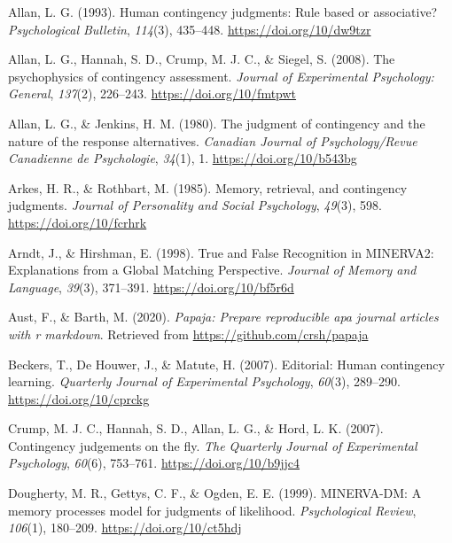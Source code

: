 \documentclass[
  english,
  man,floatsintext]{apa6}
\begin{document}
\leavevmode\hypertarget{ref-allanHumanContingencyJudgments1993}{}%
Allan, L. G. (1993). Human contingency judgments: Rule based or associative? \emph{Psychological Bulletin}, \emph{114}(3), 435--448. \url{https://doi.org/10/dw9tzr}

\leavevmode\hypertarget{ref-allanPsychophysicsContingencyAssessment2008}{}%
Allan, L. G., Hannah, S. D., Crump, M. J. C., \& Siegel, S. (2008). The psychophysics of contingency assessment. \emph{Journal of Experimental Psychology: General}, \emph{137}(2), 226--243. \url{https://doi.org/10/fmtpwt}

\leavevmode\hypertarget{ref-allanJudgmentContingencyNature1980}{}%
Allan, L. G., \& Jenkins, H. M. (1980). The judgment of contingency and the nature of the response alternatives. \emph{Canadian Journal of Psychology/Revue Canadienne de Psychologie}, \emph{34}(1), 1. \url{https://doi.org/10/b543bg}

\leavevmode\hypertarget{ref-arkesMemoryRetrievalContingency1985}{}%
Arkes, H. R., \& Rothbart, M. (1985). Memory, retrieval, and contingency judgments. \emph{Journal of Personality and Social Psychology}, \emph{49}(3), 598. \url{https://doi.org/10/fcrhrk}

\leavevmode\hypertarget{ref-arndtTrueFalseRecognition1998}{}%
Arndt, J., \& Hirshman, E. (1998). True and False Recognition in MINERVA2: Explanations from a Global Matching Perspective. \emph{Journal of Memory and Language}, \emph{39}(3), 371--391. \url{https://doi.org/10/bf5r6d}

\leavevmode\hypertarget{ref-R-papaja}{}%
Aust, F., \& Barth, M. (2020). \emph{Papaja: Prepare reproducible apa journal articles with r markdown}. Retrieved from \url{https://github.com/crsh/papaja}

\leavevmode\hypertarget{ref-beckersEditorialHumanContingency2007}{}%
Beckers, T., De Houwer, J., \& Matute, H. (2007). Editorial: Human contingency learning. \emph{Quarterly Journal of Experimental Psychology}, \emph{60}(3), 289--290. \url{https://doi.org/10/cprckg}

\leavevmode\hypertarget{ref-crumpContingencyJudgementsFly2007}{}%
Crump, M. J. C., Hannah, S. D., Allan, L. G., \& Hord, L. K. (2007). Contingency judgements on the fly. \emph{The Quarterly Journal of Experimental Psychology}, \emph{60}(6), 753--761. \url{https://doi.org/10/b9jjc4}

\leavevmode\hypertarget{ref-doughertyMINERVADMMemoryProcesses1999}{}%
Dougherty, M. R., Gettys, C. F., \& Ogden, E. E. (1999). MINERVA-DM: A memory processes model for judgments of likelihood. \emph{Psychological Review}, \emph{106}(1), 180--209. \url{https://doi.org/10/ct5hdj}
\end{document}
